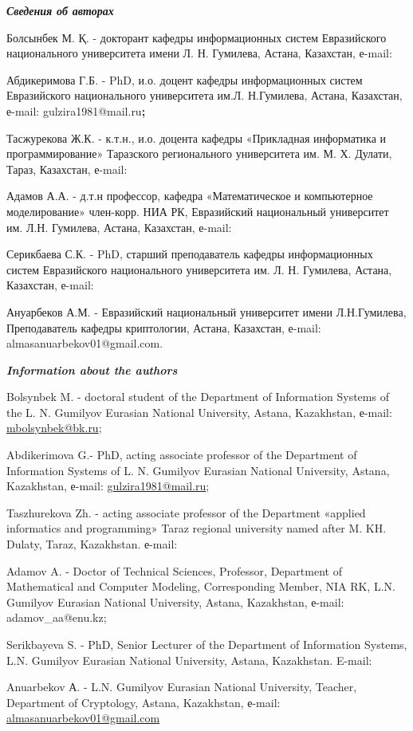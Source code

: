 \begin{authorinfo}
\emph{{\bfseries Сведения об авторах}}

Болсынбек М. Қ. - докторант кафедры информационных систем Евразийского
национального университета имени Л. Н. Гумилева, Астана, Казахстан,
е-mail:

\href{https://orcid.org/0009-0001-0233-1984}{}

Абдикеримова Г.Б. - PhD, и.о. доцент кафедры информационных систем
Евразийского национального университета им.Л. Н.Гумилева, Астана,
Казахстан, е-mail:
gulzira1981@mail.ru{\bfseries ;
\href{https://orcid.org/0000-0002-4953-0737}{}}

Тасжурекова Ж.К. - к.т.н., и.о. доцента кафедры «Прикладная
информатика и программирование» Таразского регионального университета
им. М. Х. Дулати, Тараз, Казахстан, е-mail:

Адамов А.А. - д.т.н профессор, кафедра «Математическое и
компьютерное моделирование» член-корр. НИА РК, Евразийский национальный
университет им. Л.Н. Гумилева, Астана, Казахстан, е-mail:

\href{https://orcid.org/0000-0001-9515-1263}{}

Серикбаева С.К. - PhD, старший преподаватель кафедры информационных
систем Евразийского национального университета им. Л. Н. Гумилева,
Астана, Казахстан, е-mail:

Ануарбеков А.М. - Евразийский национальный университет имени
Л.Н.Гумилева, Преподаватель кафедры криптологии, Астана, Казахстан,
е-mail:
almasanuarbekov01@gmail.com.
\href{https://orcid.org/0009-0008-5013-3553}{}

\emph{{\bfseries Information about the authors}}

Bolsynbek M. - doctoral student of the Department of Information Systems
of the L. N. Gumilyov Eurasian National University, Astana, Kazakhstan,
е-mail: \href{mailto:mbolsynbek@bk.ru}{mbolsynbek@bk.ru};

Abdikerimova G.- PhD, acting associate professor of the Department of
Information Systems of L. N. Gumilyov Eurasian National University,
Astana, Kazakhstan, е-mail:
\href{mailto:gulzira1981@mail.ru}{gulzira1981@mail.ru};

Taszhurekova Zh. - acting associate professor of the Department «applied
informatics and programming» Taraz regional university named after M.
KH. Dulaty, Taraz, Kazakhstan. е-mail:

Adamov A. - Doctor of Technical Sciences, Professor, Department of
Mathematical and Computer Modeling, Corresponding Member, NIA RK, L.N.
Gumilyov Eurasian National University, Astana, Kazakhstan, е-mail:
adamov\_aa@enu.kz;

Serikbayeva S. - PhD, Senior Lecturer of the Department of Information
Systems, L.N. Gumilyov Eurasian National University, Astana, Kazakhstan.
E-mail:

Anuarbekov А. - L.N. Gumilyov Eurasian National University, Teacher,
Department of Cryptology, Astana, Kazakhstan, е-mail:
\href{mailto:almasanuarbekov01@gmail.com}{almasanuarbekov01@gmail.com}
\end{authorinfo}
